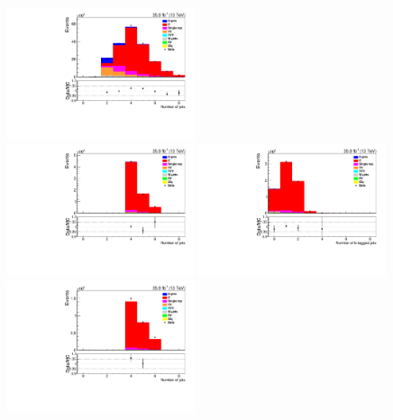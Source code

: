 \begin{figure}[ht]
\centering
\hspace*{-7.6cm}\includegraphics[width=0.49\textwidth]{figs/background-estimation/plots/unblinded/ttbar_control/numbJets_SingleTop_lepSel_emu.pdf}
\\
\includegraphics[width=0.49\textwidth]{figs/background-estimation/plots/unblinded/ttbar_control/numbJets_SingleTop_jetSel_emu.pdf}
\includegraphics[width=0.49\textwidth]{figs/background-estimation/plots/unblinded/ttbar_control/numbBJets_SingleTop_jetSel_emu.pdf}
\\
\includegraphics[width=0.49\textwidth]{figs/background-estimation/plots/unblinded/ttbar_control/numbJets_SingleTop_wMass_emu.pdf}

\end{figure}
